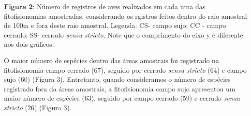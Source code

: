 \textbf{Figura 2}: Número de registros de aves realizados em cada uma das fitofisionomias amostradas, considerando os rgistros feitos dentro do raio amostral de 100m e fora deste raio amostral. Legenda: CS- campo sujo; CC -  campo cerrado; SS- cerrado \textit{sensu stricto}. Note que o comprimento do eixo y é diferente nos dois gráficos.

O maior número de espécies dentro das áreas amostrais foi registrado na fitofisionomia campo cerrado (67), seguido por cerrado \textit{sensu stricto} (64) e campo sujo (60) (Figura 3). Entretanto, quando consideramos o número de espécies registrado fora da áreas amostrais, a fitofisionomia campo sujo apresentou um maior número de espécies (63), seguido por campo cerrado (59) e cerrado \textit{sensu stricto} (26) (Figura 3).
